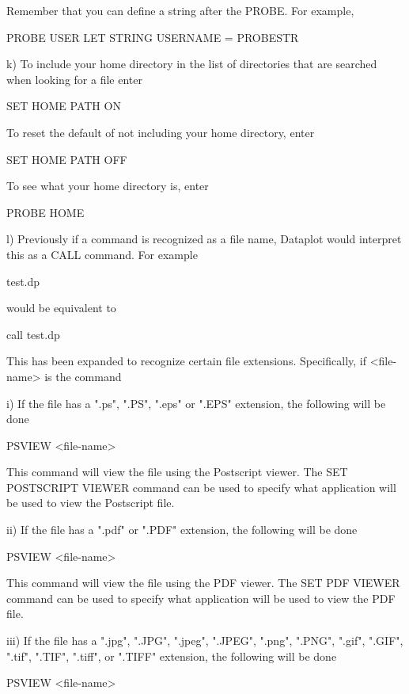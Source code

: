       Remember that you can define a string after the PROBE.  For
      example,

          PROBE USER
          LET STRING USERNAME = PROBESTR

    k) To include your home directory in the list of directories that
       are searched when looking for a file enter

          SET HOME PATH ON

       To reset the default of not including your home directory, enter

          SET HOME PATH OFF

       To see what your home directory is, enter

          PROBE HOME

    l) Previously if a command is recognized as a file name, Dataplot
       would interpret this as a CALL command.  For example

           test.dp

       would be equivalent to

           call test.dp

       This has been expanded to recognize certain file extensions.
       Specifically, if <file-name> is the command

           i) If the file has a ".ps", ".PS", ".eps" or ".EPS" extension,
              the following will be done

                  PSVIEW  <file-name>

              This command will view the file using the Postscript
              viewer.  The SET POSTSCRIPT VIEWER command can be used to
              specify what application will be used to view the
              Postscript file.

          ii) If the file has a ".pdf" or ".PDF" extension, the following
              will be done

                  PSVIEW  <file-name>

              This command will view the file using the PDF viewer.  The
              SET PDF VIEWER command can be used to specify what
              application will be used to view the PDF file.

         iii) If the file has a ".jpg", ".JPG", ".jpeg", ".JPEG", ".png",
              ".PNG", ".gif", ".GIF", ".tif", ".TIF", ".tiff",  or ".TIFF"
              extension, the following will be done

                  PSVIEW  <file-name>

